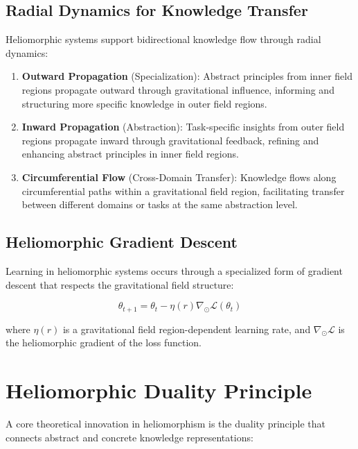 \subsection{Radial Dynamics for Knowledge Transfer}

Heliomorphic systems support bidirectional knowledge flow through radial dynamics:

\begin{enumerate}
    \item \textbf{Outward Propagation} (Specialization): Abstract principles from inner field regions propagate outward through gravitational influence, informing and structuring more specific knowledge in outer field regions.
    
    \item \textbf{Inward Propagation} (Abstraction): Task-specific insights from outer field regions propagate inward through gravitational feedback, refining and enhancing abstract principles in inner field regions.
    
    \item \textbf{Circumferential Flow} (Cross-Domain Transfer): Knowledge flows along circumferential paths within a gravitational field region, facilitating transfer between different domains or tasks at the same abstraction level.
\end{enumerate}

\subsection{Heliomorphic Gradient Descent}

Learning in heliomorphic systems occurs through a specialized form of gradient descent that respects the gravitational field structure:

\begin{equation}
\theta_{t+1} = \theta_t - \eta(r) \nabla_{\odot} \mathcal{L}(\theta_t)
\end{equation}

where $\eta(r)$ is a gravitational field region-dependent learning rate, and $\nabla_{\odot} \mathcal{L}$ is the heliomorphic gradient of the loss function.

\section{Heliomorphic Duality Principle}

A core theoretical innovation in heliomorphism is the duality principle that connects abstract and concrete knowledge representations:

